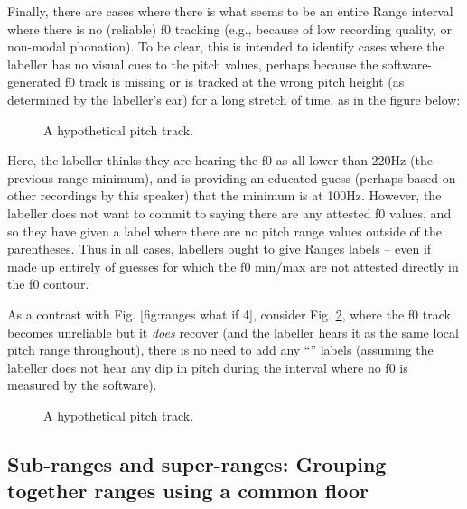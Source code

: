 Finally, there are cases where there is what seems to be an entire Range interval where there is no (reliable) f0 tracking (e.g., because of low recording quality, or non-modal phonation). To be clear, this is intended to identify cases where the labeller has no visual cues to the pitch values, perhaps because the software-generated f0 track is missing or is tracked at the wrong pitch height (as determined by the labeller’s ear) for a long stretch of time, as in the figure below:

\begin{figure}[H]
\centering
%

%
\caption{A hypothetical pitch track.%
\label{fig:ranges-what-if4 Ranges Adv}%
}
\end{figure}

Here, the labeller thinks they are hearing the f0 as all lower than 220Hz (the previous range minimum), and is providing an educated guess (perhaps based on other recordings by this speaker) that the minimum is at 100Hz. However, the labeller does not want to commit to saying there are any attested f0 values, and so they have given a label where there are no pitch range values outside of the parentheses. Thus in all cases, labellers ought to give Ranges labels – even if made up entirely of guesses for which the f0 min\slash max are not attested directly in the f0 contour.

As a contrast with Fig. [fig:ranges what if 4], consider Fig. \ref{fig:ranges-what-if5 Ranges Adv}, where the f0 track becomes unreliable but it \emph{does} recover (and the labeller hears it as the same local pitch range throughout), there is no need to add any “” labels (assuming the labeller does not hear any dip in pitch during the interval where no f0 is measured by the software).

\begin{figure}[H]
\centering
%

%
\caption{A hypothetical pitch track.%
\label{fig:ranges-what-if5 Ranges Adv}%
}
\end{figure}

\subsection{Sub-ranges and super-ranges: Grouping together ranges using a common floor}\label{sec:sub-ranges-and-super-ranges-grouping-together-ranges-using-a-common-floor}

